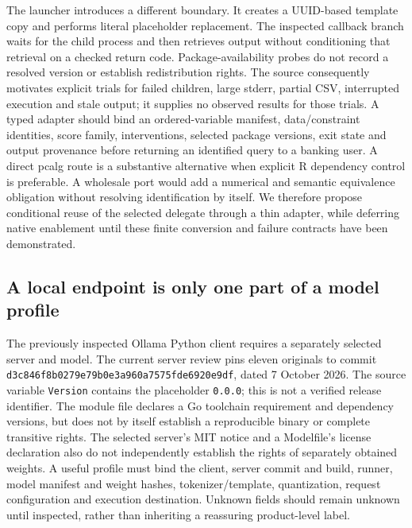 The launcher introduces a different boundary. It creates a UUID-based template copy and
performs literal placeholder replacement. The inspected callback branch waits for the child
process and then retrieves output without conditioning that retrieval on a checked return code.
Package-availability probes do not record a resolved version or establish redistribution rights.
The source consequently motivates explicit trials for failed children, large stderr, partial
CSV, interrupted execution and stale output; it supplies no observed results for those trials.
A typed adapter should bind an ordered-variable manifest, data/constraint identities, score
family, interventions, selected package versions, exit state and output provenance before
returning an identified query to a banking user. A direct pcalg route is a substantive alternative
when explicit R dependency control is preferable. A wholesale port would add a numerical and
semantic equivalence obligation without resolving identification by itself. We therefore propose
conditional reuse of the selected delegate through a thin adapter, while deferring native
enablement until these finite conversion and failure contracts have been demonstrated.
\citep{exec28_bp_cdt}

\subsection{A local endpoint is only one part of a model profile}
The previously inspected Ollama Python client requires a separately selected server and model.
The current server review pins eleven originals to commit
\texttt{d3c846f8b0279e79b0e3\allowbreak{}a960a7575fde6920e9df}, dated 7 October 2026.
The source variable \texttt{Version} contains the placeholder \texttt{0.0.0}; this is not a
verified release identifier. The module file declares a Go toolchain requirement and dependency
versions, but does not by itself establish a reproducible binary or complete transitive rights.
The selected server's MIT notice and a Modelfile's license declaration also do not independently
establish the rights of separately obtained weights. A useful profile must bind the client,
server commit and build, runner, model manifest and weight hashes, tokenizer/template,
quantization, request configuration and execution destination. Unknown fields should remain
unknown until inspected, rather than inheriting a reassuring product-level label.
\citep{exec28_bp_ollama}

